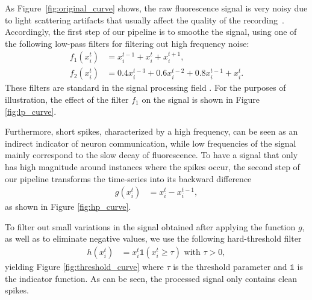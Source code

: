 \documentclass[wcp]{jmlr}
\begin{document}
As Figure~\ref{fig:original_curve} shows, the raw
fluorescence signal is very noisy due to light scattering artifacts that
usually affect the quality of the recording~\citep{lichtman2011big}.
Accordingly, the first step of our pipeline is to smoothe the signal, using
one of the following low-pass filters for filtering out high frequency noise:
\begin{align}
f_1(x^t_i) &= x^{t-1}_i + x^t_i + x^{t+1}_i, \label{eq:symetric-median} \\
f_2(x^t_i) &= 0.4 x^{t-3}_i + 0.6 x^{t-2}_i + 0.8 x^{t-1}_i + x_i^t.
\label{eq:weighted-asymetric-median}
\end{align}
These filters are standard in the signal processing field \citep{kaiser1977data, oppenheim1983signals}. For the purposes of illustration, the effect of the filter $f_1$ on the signal
is shown in Figure \ref{fig:lp_curve}.

Furthermore, short spikes, characterized by a high
frequency, can be seen as an indirect indicator of neuron communication, while low frequencies of the signal mainly correspond to the slow
decay of fluorescence. To have a signal that only has high magnitude around instances where the spikes occur, the second step of our pipeline transforms the time-series into its backward
difference
\begin{align}
g(x^{t}_{i}) &= x^{t}_i - x^{t-1}_i, \label{eq:high-pass-filter}
\end{align}
as shown in Figure \ref{fig:hp_curve}.

To filter out small variations in the signal obtained after applying the
function $g$, as well as to eliminate negative values, we use the following
hard-threshold filter
\begin{align}\label{eqn:hfilter}
h(x^{t}_i) &= x^{t}_i \mathbb{1}(x^{t}_i \geq \tau) \text{ with } \tau > 0,
\end{align}
yielding Figure \ref{fig:threshold_curve} where $\tau$ is the threshold parameter and $\mathbb{1}$ is the indicator function.
As can be seen, the processed signal only contains clean spikes.
\end{document}
